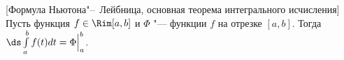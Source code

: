 [Формула Ньютона"--~Лейбница, основная теорема интегрального исчисления]
    Пусть функция $f\in\Rim[a,b]$ и $\Phi$ "--- \op{} функции $f$ на отрезке $[a,b]$.
    Тогда $\ds\int\limits_a^bf(t)dt=\Phi\Big|_a^b$.
    